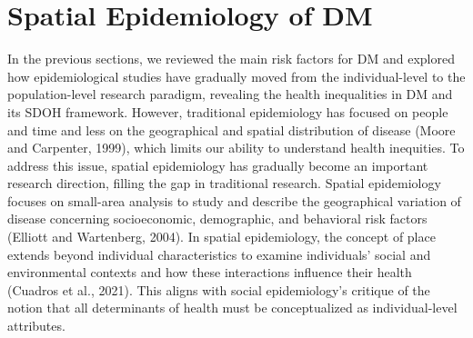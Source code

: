 \section{Spatial Epidemiology of DM}
\label{sec:2.3}
In the previous sections, we reviewed the main risk factors for DM and explored how epidemiological studies have gradually moved from the individual-level to the population-level research paradigm, revealing the health inequalities in DM and its SDOH framework. However, traditional epidemiology has focused on people and time and less on the geographical and spatial distribution of disease (Moore and Carpenter, 1999), which limits our ability to understand health inequities. To address this issue, spatial epidemiology has gradually become an important research direction, filling the gap in traditional research. Spatial epidemiology focuses on small-area analysis to study and describe the geographical variation of disease concerning socioeconomic, demographic, and behavioral risk factors (Elliott and Wartenberg, 2004). In spatial epidemiology, the concept of place extends beyond individual characteristics to examine individuals' social and environmental contexts and how these interactions influence their health (Cuadros et al., 2021). This aligns with social epidemiology's critique of the notion that all determinants of health must be conceptualized as individual-level attributes.


